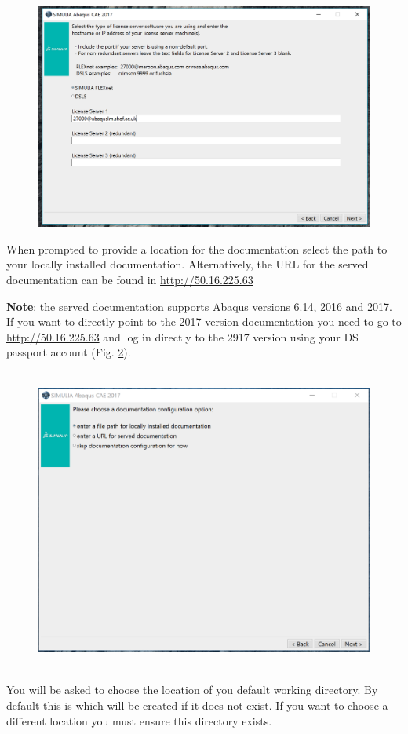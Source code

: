 \documentclass[10pt,a4paper,oneside]{article}
\begin{document}
\begin{figure}[ht]
\centering
	\includegraphics[width=14 cm, height=10 cm]{abaqus_license.png} 
	\caption{}
	\label{fig:abaqus2}
\end{figure}

When prompted to provide a location for the documentation select the path to your locally installed documentation. Alternatively, the URL for the served documentation can be found in \url{http://50.16.225.63} 

\textbf{Note}: the served documentation supports Abaqus versions 6.14, 2016 and 2017. If you want to directly point to the 2017 version documentation you need to go to \url{http://50.16.225.63} and log in directly to the 2917 version using your DS passport account (Fig. \ref{fig:abaqus3}).

\begin{figure}[ht]
\centering
	\includegraphics[width=14cm, height=10cm]{documentation_CAE.png} 
	\caption{}
	\label{fig:abaqus3}
\end{figure}
\FloatBarrier
You will be asked to choose the location of you default working directory. By default this is \textbf{} which will be created if it does not exist. If you want to choose a different location you must ensure this directory  exists. 
\end{document}
